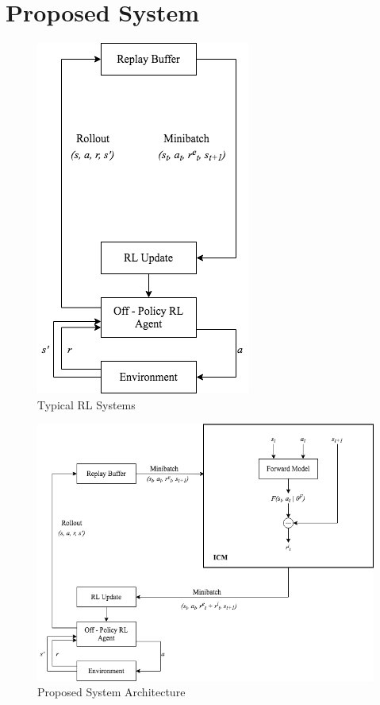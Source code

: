\documentclass[12pt,a4paper]{article}
\begin{document}
\section{Proposed System}

\begin{figure}[H]
  \centering
  \includegraphics[scale=0.55]{review-0-prev-architecture.png}
  \caption{Typical RL Systems}
  \label{fig:typical-system}
\end{figure}

\begin{figure}[H]
  \centering
  \includegraphics[scale=0.55]{review-0-architecture.png}
  \caption{Proposed System Architecture}
  \label{fig:proposed-system}
\end{figure}
\end{document}
